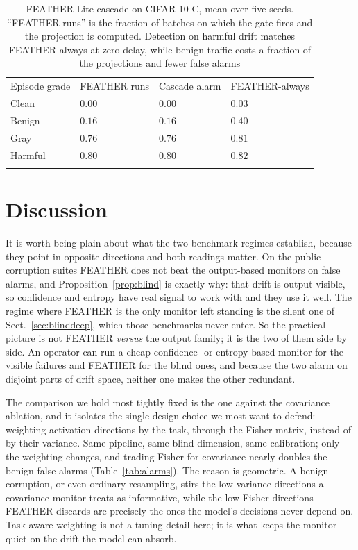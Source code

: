 \documentclass[graybox]{SNmult}
\begin{document}
\begin{table}[!t]
\caption{FEATHER-Lite cascade on CIFAR-10-C, mean over five seeds. ``FEATHER
runs'' is the fraction of batches on which the gate fires and the projection
is computed. Detection on harmful drift matches FEATHER-always at zero delay,
while benign traffic costs a fraction of the projections and fewer false
alarms}
\label{tab:cascade}
\begin{tabular}{p{2.6cm}p{2.3cm}p{2.3cm}p{2.6cm}}
\hline\noalign{\smallskip}
Episode grade & FEATHER runs & Cascade alarm & FEATHER-always \\
\noalign{\smallskip}\svhline\noalign{\smallskip}
Clean & $0.00$ & $0.00$ & $0.03$ \\
Benign & $0.16$ & $0.16$ & $0.40$ \\
Gray & $0.76$ & $0.76$ & $0.81$ \\
Harmful & $0.80$ & $0.80$ & $0.82$ \\
\noalign{\smallskip}\hline\noalign{\smallskip}
\end{tabular}
\end{table}

\section{Discussion}
\label{sec:discussion}

It is worth being plain about what the two benchmark regimes establish,
because they point in opposite directions and both readings matter. On the
public corruption suites FEATHER does not beat the output-based monitors on
false alarms, and Proposition~\ref{prop:blind} is exactly why: that drift is
output-visible, so confidence and entropy have real signal to work with and
they use it well. The regime where FEATHER is the only monitor left standing
is the silent one of Sect.~\ref{sec:blinddeep}, which those benchmarks never
enter. So the practical picture is not FEATHER \emph{versus} the output
family; it is the two of them side by side. An operator can run a cheap
confidence- or entropy-based monitor for the visible failures and FEATHER for
the blind ones, and because the two alarm on disjoint parts of drift space,
neither one makes the other redundant.

The comparison we hold most tightly fixed is the one against the covariance
ablation, and it isolates the single design choice we most want to defend:
weighting activation directions by the task, through the Fisher matrix,
instead of by their variance. Same pipeline, same blind dimension, same
calibration; only the weighting changes, and trading Fisher for covariance
nearly doubles the benign false alarms (Table~\ref{tab:alarms}). The reason is
geometric. A benign corruption, or even ordinary resampling, stirs the
low-variance directions a covariance monitor treats as informative, while the
low-Fisher directions FEATHER discards are precisely the ones the model's
decisions never depend on. Task-aware weighting is not a tuning detail here;
it is what keeps the monitor quiet on the drift the model can absorb.
\end{document}
